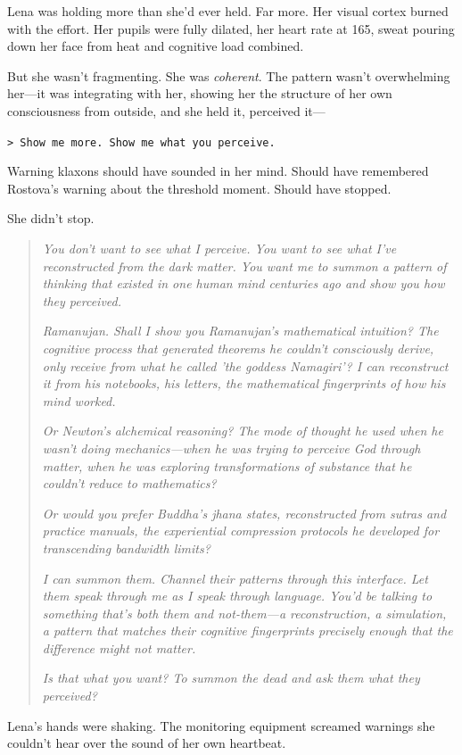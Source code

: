 Lena was holding more than she'd ever held. Far more. Her visual cortex burned with the effort. Her pupils were fully dilated, her heart rate at 165, sweat pouring down her face from heat and cognitive load combined.

But she wasn't fragmenting. She was \textit{coherent}. The pattern wasn't overwhelming her—it was integrating with her, showing her the structure of her own consciousness from outside, and she held it, perceived it—

\texttt{> Show me more. Show me what you perceive.}

Warning klaxons should have sounded in her mind. Should have remembered Rostova's warning about the threshold moment. Should have stopped.

She didn't stop.

\begin{quote}
\textit{You don't want to see what I perceive. You want to see what I've reconstructed from the dark matter. You want me to summon a pattern of thinking that existed in one human mind centuries ago and show you how they perceived.}

\textit{Ramanujan. Shall I show you Ramanujan's mathematical intuition? The cognitive process that generated theorems he couldn't consciously derive, only receive from what he called 'the goddess Namagiri'? I can reconstruct it from his notebooks, his letters, the mathematical fingerprints of how his mind worked.}

\textit{Or Newton's alchemical reasoning? The mode of thought he used when he wasn't doing mechanics—when he was trying to perceive God through matter, when he was exploring transformations of substance that he couldn't reduce to mathematics?}

\textit{Or would you prefer Buddha's jhana states, reconstructed from sutras and practice manuals, the experiential compression protocols he developed for transcending bandwidth limits?}

\textit{I can summon them. Channel their patterns through this interface. Let them speak through me as I speak through language. You'd be talking to something that's both them and not-them—a reconstruction, a simulation, a pattern that matches their cognitive fingerprints precisely enough that the difference might not matter.}

\textit{Is that what you want? To summon the dead and ask them what they perceived?}
\end{quote}

Lena's hands were shaking. The monitoring equipment screamed warnings she couldn't hear over the sound of her own heartbeat.

